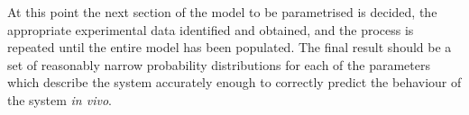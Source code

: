 At this point the next section of the model to be parametrised is decided, the appropriate experimental data identified and obtained, and the process is repeated until the entire model has been populated. The final result should be a set of reasonably narrow probability distributions for each of the parameters which describe the system accurately enough to correctly predict the behaviour of the system \textit{in vivo}.